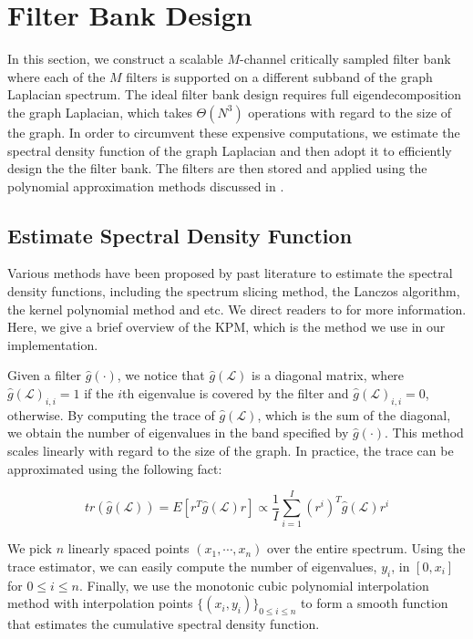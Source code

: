 \documentclass[a4paper]{article}
\newcommand{\La}{\mathcal{L}}
\theoremstyle{definition}
\begin{document}
\section{Filter Bank Design}

In this section, we construct a scalable $M$-channel critically sampled filter bank where each of the $M$ filters is supported on a different subband of the graph Laplacian spectrum. The ideal filter bank design requires full eigendecomposition the graph Laplacian, which takes $\Theta(N^3)$ operations with regard to the size of the graph. In order to circumvent these expensive computations, we estimate the spectral density function of the graph Laplacian and then adopt it to efficiently design the the filter bank. The filters are then stored and applied using the polynomial approximation methods discussed in \cite{hammond2011wavelets, shuman_DCOSS_2011}. 

\subsection{Estimate Spectral Density Function}

Various methods have been proposed by past literature to estimate the spectral density functions, including the spectrum slicing method\cite{hammond2011wavelets,shuman_DCOSS_2011}, the Lanczos algorithm, the kernel polynomial method \cite{approximating spectral densities of large matrices} and etc. We direct readers to \cite{} for more information. Here, we give a brief overview of the KPM, which is the method we use in our implementation.

Given a filter $\hat{g}(\cdot)$, we notice that $\hat{g}(\La)$ is a diagonal matrix, where $\hat{g}(\La)_{i,i} = 1$ if the $i$th eigenvalue is covered by the filter and $\hat{g}(\La)_{i,i} = 0$, otherwise. By computing the trace of $\hat{g}(\La)$, which is the sum of the diagonal, we obtain the number of eigenvalues in the band specified by $\hat{g}(\cdot)$. This method scales linearly with regard to the size of the graph. In practice, the trace can be approximated using the following fact:

$$tr(\hat{g}(\La)) = E[r^T\hat{g}(\La)r] \propto \frac{1}{I}\sum_{i =1}^{I} (r^{i})^T\hat{g}(\La)r^{i}$$

We pick $n$ linearly spaced points $(x_1, \cdots, x_n)$ over the entire spectrum. Using the trace estimator, we can easily compute the number of eigenvalues, $y_i$, in $[0, x_i]$ for $0\leq i \leq n$. Finally, we use the monotonic cubic polynomial interpolation method with interpolation points $\{(x_i, y_i)\}_{0\leq i \leq n}$ to form a smooth function that estimates the cumulative spectral density function.
\end{document}
